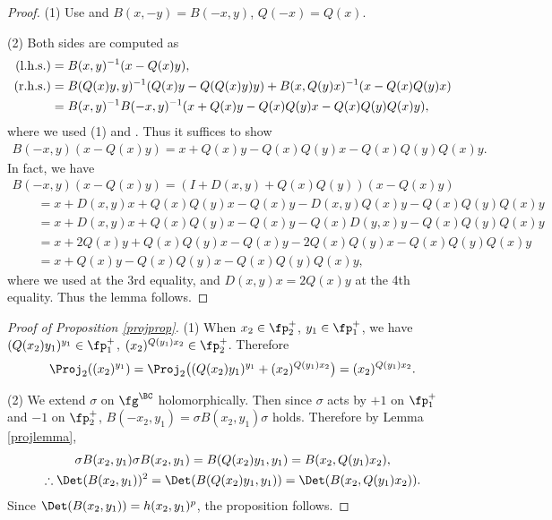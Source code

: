 \begin{proof}
(1) Use \cite[Part V, Proposition I.5.1, (J4.2), (J4.2$'$)]{FKKLR} and $B(x,-y)=B(-x,y)$, $Q(-x)=Q(x)$.

(2) Both sides are computed as
\begin{align*}
({\rm l.h.s.})&=B(x,y)^{-1}(x-Q(x)y),\\
({\rm r.h.s.})&=B(Q(x)y,y)^{-1}(Q(x)y-Q(Q(x)y)y)+B(x,Q(y)x)^{-1}(x-Q(x)Q(y)x) \\
&=B(x,y)^{-1}B(-x,y)^{-1}(x+Q(x)y-Q(x)Q(y)x-Q(x)Q(y)Q(x)y),
\end{align*}
where we used (1) and \cite[Part V, Proposition I.4.1]{FKKLR}. Thus it suffices to show
\begin{gather*} B(-x,y)(x-Q(x)y)=x+Q(x)y-Q(x)Q(y)x-Q(x)Q(y)Q(x)y. \end{gather*}
In fact, we have
\begin{gather*}
B(-x,y)(x-Q(x)y) =(I+D(x,y)+Q(x)Q(y))(x-Q(x)y) \\
\qquad{}=x+D(x,y)x+Q(x)Q(y)x-Q(x)y-D(x,y)Q(x)y-Q(x)Q(y)Q(x)y \\
\qquad{}=x+D(x,y)x+Q(x)Q(y)x-Q(x)y-Q(x)D(y,x)y-Q(x)Q(y)Q(x)y \\
\qquad{}=x+2Q(x)y+Q(x)Q(y)x-Q(x)y-2Q(x)Q(y)x-Q(x)Q(y)Q(x)y \\
\qquad{}=x+Q(x)y-Q(x)Q(y)x-Q(x)Q(y)Q(x)y,
\end{gather*}
where we used \cite[Part V, Proposition I.2.1(J1)]{FKKLR} at the 3rd equality, and $D(x,y)x=2Q(x)y$ at the 4th equality.
Thus the lemma follows.
\end{proof}

\begin{proof}[Proof of Proposition \ref{projprop}]
(1) When $x_2\in\fp^+_2$, $y_1\in\fp^+_1$, we have $(Q(x_2)y_1)^{y_1}\in\fp^+_1$, $(x_2)^{Q(y_1)x_2}\allowbreak\in\fp^+_2$. Therefore
\begin{gather*} \Proj_2((x_2)^{y_1})=\Proj_2\big((Q(x_2)y_1)^{y_1}+(x_2)^{Q(y_1)x_2}\big)=(x_2)^{Q(y_1)x_2}. \end{gather*}

(2) We extend $\sigma$ on $\fg^\BC$ holomorphically. Then since $\sigma$ acts by $+1$ on $\fp^+_1$ and $-1$ on $\fp^+_2$,
$B(-x_2,y_1)=\sigma B(x_2,y_1)\sigma$ holds. Therefore by Lemma \ref{projlemma},
\begin{gather*}
\sigma B(x_2,y_1)\sigma B(x_2,y_1)=B(Q(x_2)y_1,y_1)=B(x_2,Q(y_1)x_2), \\
\therefore \Det(B(x_2,y_1))^2=\Det(B(Q(x_2)y_1,y_1))=\Det(B(x_2,Q(y_1)x_2)).
\end{gather*}
Since $\Det(B(x_2,y_1))=h(x_2,y_1)^p$, the proposition follows.
\end{proof}

